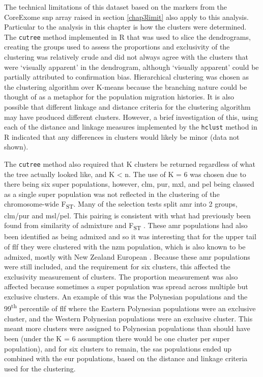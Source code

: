 \documentclass[]{report}
\begin{document}
The technical limitations of this dataset based on the markers from the
CoreExome \gls{snp} array raised in section \ref{chap3limit} also apply
to this analysis. Particular to the analysis in this chapter is how the
clusters were determined. The \texttt{cutree} method implemented in R
\citep{RCoreTeam2017} that was used to slice the dendrograms, creating
the groups used to assess the proportions and exclusivity of the
clustering was relatively crude and did not always agree with the
clusters that were `visually apparent' in the dendrogram, although
`visually apparent' could be partially attributed to confirmation bias.
Hierarchical clustering was chosen as the clustering algorithm over
K-means because the branching nature could be thought of as a metaphor
for the population migration histories. It is also possible that
different linkage and distance criteria for the clustering algorithm may
have produced different clusters. However, a brief investigation of
this, using each of the distance and linkage measures implemented by the
\texttt{hclust} method in R indicated that any differences in clusters
would likely be minor (data not shown).

The \texttt{cutree} method also required that K clusters be returned
regardless of what the tree actually looked like, and K \textless{} n.
The use of K = 6 was chosen due to there being six super populations,
however, \gls{clm}, \gls{pur}, \gls{mxl}, and \gls{pel} being classed as
a single super population was not reflected in the clustering of the
chromosome-wide F\textsubscript{ST}. Many of the selection tests split
\gls{amr} into 2 groups, \gls{clm}/\gls{pur} and \gls{msl}/\gls{pel}.
This pairing is consistent with what had previously been found from
similarity of admixture and F\textsubscript{ST}
\citep{Gravel2013, 1KGP2015snp}. These \gls{amr} populations had also
been identified as being admixed and so it was interesting that for the
upper tail of \gls{flf} they were clustered with the \gls{nzm}
population, which is also known to be admixed, mostly with New Zealand
European \citep{Hollis-Moffatt2012, Gravel2013}. Because these \gls{amr}
populations were still included, and the requirement for six clusters,
this affected the exclusivity measurement of clusters. The proportion
measurement was also affected because sometimes a super population was
spread across multiple but exclusive clusters. An example of this was
the Polynesian populations and the 99\textsuperscript{th} percentile of
\gls{flf} where the Eastern Polynesian populations were an exclusive
cluster, and the Western Polynesian populations were an exclusive
cluster. This meant more clusters were assigned to Polynesian
populations than should have been (under the K = 6 assumption there
would be one cluster per super population), and for six clusters to
remain, the \gls{sas} populations ended up combined with the \gls{eur}
populations, based on the distance and linkage criteria used for the
clustering.
\end{document}
